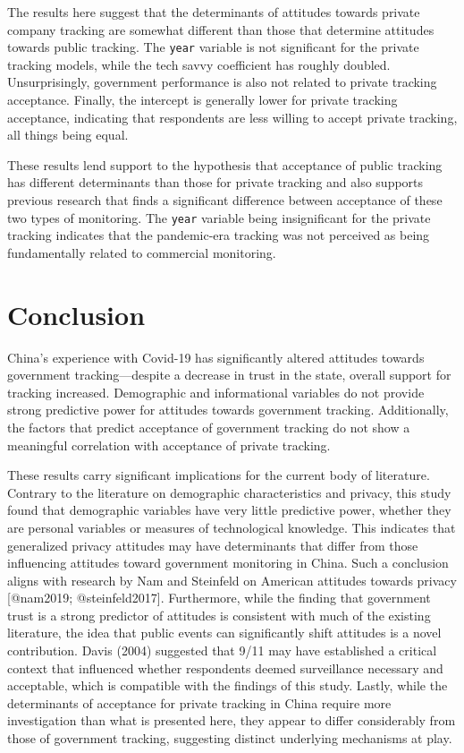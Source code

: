 \documentclass[
  letterpaper,
  DIV=11,
  numbers=noendperiod]{scrartcl}
\begin{document}
The results here suggest that the determinants of attitudes towards
private company tracking are somewhat different than those that
determine attitudes towards public tracking. The \texttt{year} variable
is not significant for the private tracking models, while the tech savvy
coefficient has roughly doubled. Unsurprisingly, government performance
is also not related to private tracking acceptance. Finally, the
intercept is generally lower for private tracking acceptance, indicating
that respondents are less willing to accept private tracking, all things
being equal.

These results lend support to the hypothesis that acceptance of public
tracking has different determinants than those for private tracking and
also supports previous research that finds a significant difference
between acceptance of these two types of monitoring. The \texttt{year}
variable being insignificant for the private tracking indicates that the
pandemic-era tracking was not perceived as being fundamentally related
to commercial monitoring.

\section{Conclusion}\label{sec-conclusion}

China's experience with Covid-19 has significantly altered attitudes
towards government tracking---despite a decrease in trust in the state,
overall support for tracking increased. Demographic and informational
variables do not provide strong predictive power for attitudes towards
government tracking. Additionally, the factors that predict acceptance
of government tracking do not show a meaningful correlation with
acceptance of private tracking.

These results carry significant implications for the current body of
literature. Contrary to the literature on demographic characteristics
and privacy, this study found that demographic variables have very
little predictive power, whether they are personal variables or measures
of technological knowledge. This indicates that generalized privacy
attitudes may have determinants that differ from those influencing
attitudes toward government monitoring in China. Such a conclusion
aligns with research by Nam and Steinfeld on American attitudes towards
privacy {[}@nam2019; @steinfeld2017{]}. Furthermore, while the finding
that government trust is a strong predictor of attitudes is consistent
with much of the existing literature, the idea that public events can
significantly shift attitudes is a novel contribution. Davis (2004)
suggested that 9/11 may have established a critical context that
influenced whether respondents deemed surveillance necessary and
acceptable, which is compatible with the findings of this study. Lastly,
while the determinants of acceptance for private tracking in China
require more investigation than what is presented here, they appear to
differ considerably from those of government tracking, suggesting
distinct underlying mechanisms at play.
\end{document}
